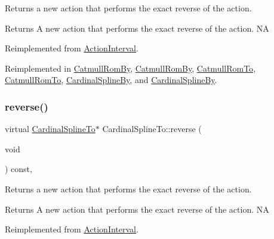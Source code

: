 Returns a new action that performs the exact reverse of the action.

\begin{DoxyReturn}{Returns}
A new action that performs the exact reverse of the action.  NA 
\end{DoxyReturn}


Reimplemented from \hyperlink{classActionInterval_a9f9ac7164036a0bc261a72f62a2b2da7}{Action\+Interval}.



Reimplemented in \hyperlink{classCatmullRomBy_ab489930d039c543d5965637ed50420d3}{Catmull\+Rom\+By}, \hyperlink{classCatmullRomBy_a2f027f2c6627f98ffcc75a64ff6b0cd0}{Catmull\+Rom\+By}, \hyperlink{classCatmullRomTo_a4657e8372500bbf9faa339cde93d1610}{Catmull\+Rom\+To}, \hyperlink{classCatmullRomTo_ac3a4e10bb0ce746fc0dc76d804482bc3}{Catmull\+Rom\+To}, \hyperlink{classCardinalSplineBy_a565e7afdb1544698e29dda40a201ccae}{Cardinal\+Spline\+By}, and \hyperlink{classCardinalSplineBy_ac5084ddc681589404f2a26d52815344b}{Cardinal\+Spline\+By}.

\mbox{\label{classCardinalSplineTo_aea43897c48192fa9e19f45c343d0a7fd}} 
\subsubsection{\texorpdfstring{reverse()}{reverse()}\hspace{0.1cm}{\footnotesize\ttfamily [2/2]}}
{\footnotesize\ttfamily virtual \hyperlink{classCardinalSplineTo}{Cardinal\+Spline\+To}$\ast$ Cardinal\+Spline\+To\+::reverse (\begin{DoxyParamCaption}\item[{void}]{ }\end{DoxyParamCaption}) const\hspace{0.3cm}{\ttfamily [override]}, {\ttfamily [virtual]}}

Returns a new action that performs the exact reverse of the action.

\begin{DoxyReturn}{Returns}
A new action that performs the exact reverse of the action.  NA 
\end{DoxyReturn}


Reimplemented from \hyperlink{classActionInterval_a9f9ac7164036a0bc261a72f62a2b2da7}{Action\+Interval}.



